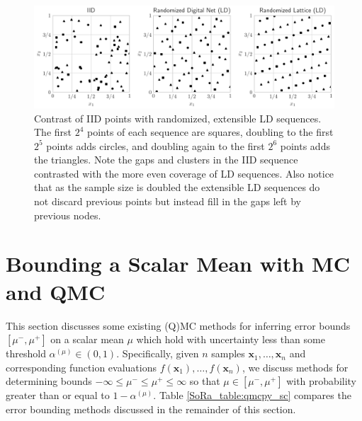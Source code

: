 \documentclass[graybox]{svmult}
\begin{document}
\begin{figure}[t]
    \centering
    \includegraphics[width=\textwidth]{figs/ld_seqs.pdf}
    \caption{Contrast of IID points with randomized, extensible LD sequences. The first $2^4$ points of each sequence are squares, doubling to the first $2^5$ points adds circles, and doubling again to the first $2^6$ points adds the triangles. Note the gaps and clusters in the IID sequence contrasted with the more even coverage of LD sequences. Also notice that as the sample size is doubled the extensible LD sequences do not discard previous points but instead fill in the gaps left by previous nodes.}
    \label{SoRa_fig:ld_seqs}
\end{figure}

\section{Bounding a Scalar Mean with MC and QMC}\label{SoRa_sec:Existing_QMC_Methods}

This section discusses some existing (Q)MC methods for inferring error bounds $[\mu^-,\mu^+]$ on a scalar mean $\mu$ which hold with uncertainty less than some threshold $\alpha^{(\mu)} \in (0,1)$. Specifically, given $n$ samples $\boldsymbol{x}_1,\dots,\boldsymbol{x}_n$ and corresponding function evaluations $f(\boldsymbol{x}_1),\dots,f(\boldsymbol{x}_n)$, we discuss methods for determining bounds $-\infty \leq \mu^- \leq \mu^+ \leq \infty$ so that $\mu \in [\mu^-,\mu^+]$ with probability greater than or equal to $1-\alpha^{(\mu)}$. Table \ref{SoRa_table:qmcpy_sc} compares the error bounding methods discussed in the remainder of this section.
\end{document}
